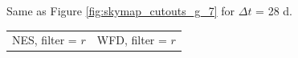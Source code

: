 \documentclass[preprintm,linenumbers]{aastex631}
\begin{document}
\begin{figure}
\begin{tabular}{@{}c@{}c@{}}
			\end{tabular}
			\caption{
   Same as Figure \ref{fig:skymap_cutouts_g_7} for $\Delta t$ = 28 d. 
    }
	\label{fig:skymap_cutouts_g_28}
		\end{figure}

  
  	\begin{figure}
			\centering
            			\begin{tabular}{@{}c@{}c@{}}
                 NES, filter = $r$ & WFD, filter = $r$ \\

\end{tabular}
\end{figure}
\end{document}

